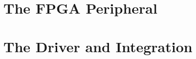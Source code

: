 \documentclass[10pt, twoside, openright]{book}
\begin{document}
\frontmatter

\tableofcontents


\mainmatter
\part{The FPGA Peripheral}
\label{part:vhdl}






\part{The Driver and Integration}
\label{part:cpp}






\appendix
{}







\end{document}

